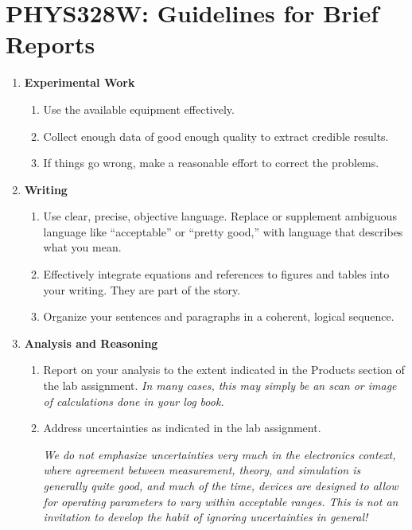 \documentclass[11 pt]{article}
\begin{document}
\section*{PHYS328W: Guidelines for Brief Reports}

\begin{enumerate}
\item \textbf{Experimental Work}
  \begin{enumerate}
  \item Use the available equipment effectively.

  \item Collect enough data of good enough quality to extract credible
    results.

  \item If things go wrong, make a reasonable effort to correct
    the problems.

  \end{enumerate}

\item \textbf{Writing}
  \begin{enumerate}
  \item Use clear, precise, objective language. Replace or supplement
    ambiguous language like ``acceptable'' or ``pretty good,'' with
    language that describes what you mean.

  \item Effectively integrate equations and references to figures and
    tables into your writing. They are part of the story. 

  \item Organize your sentences and paragraphs in a coherent, logical
    sequence. 
  \end{enumerate}

\item \textbf{Analysis and Reasoning}
  \begin{enumerate}
  \item Report on your analysis to the extent indicated in the
    Products section of the lab assignment. \emph{In many cases, this
      may simply be an scan or image of calculations done in your log
      book.}

  \item Address uncertainties as indicated in the lab
    assignment.

    \emph{We do not emphasize uncertainties very much in the
      electronics context, where agreement between measurement,
      theory, and simulation is generally quite good, and much of the
      time, devices are designed to allow for operating parameters to
      vary within acceptable ranges. This is not an invitation to
      develop the habit of ignoring uncertainties in general!}


\end{enumerate}
\end{enumerate}
\end{document}

